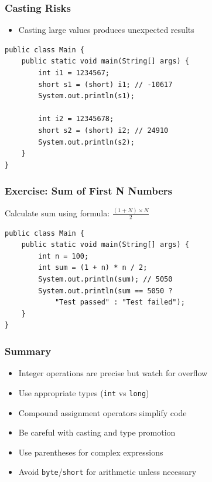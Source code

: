 \documentclass[serif, aspectratio=169]{beamer}
\begin{document}
\begin{frame}[fragile]
\frametitle{Casting Risks}
\begin{itemize}
    \item Casting large values produces unexpected results
\end{itemize}
\begin{lstlisting}
public class Main {
    public static void main(String[] args) {
        int i1 = 1234567;
        short s1 = (short) i1; // -10617
        System.out.println(s1);
        
        int i2 = 12345678;
        short s2 = (short) i2; // 24910
        System.out.println(s2);
    }
}
\end{lstlisting}
\end{frame}

\begin{frame}[fragile]
\frametitle{Exercise: Sum of First N Numbers}
Calculate sum using formula: $\frac{(1+N) \times N}{2}$
\begin{lstlisting}
public class Main {
    public static void main(String[] args) {
        int n = 100;
        int sum = (1 + n) * n / 2;
        System.out.println(sum); // 5050
        System.out.println(sum == 5050 ? 
            "Test passed" : "Test failed");
    }
}
\end{lstlisting}
\end{frame}

\begin{frame}[fragile]
\frametitle{Summary}
\begin{itemize}
    \item Integer operations are precise but watch for overflow
    \item Use appropriate types (\texttt{int} vs \texttt{long})
    \item Compound assignment operators simplify code
    \item Be careful with casting and type promotion
    \item Use parentheses for complex expressions
    \item Avoid \texttt{byte}/\texttt{short} for arithmetic unless necessary
\end{itemize}
\end{frame}
\end{document}
